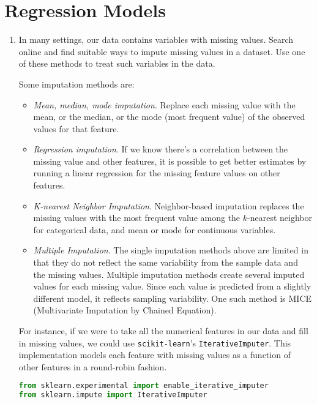 \documentclass{article}
\begin{document}
\section{Regression Models}
\begin{enumerate}[label={(\alph*)}]
    \item In many settings, our data contains variables with missing values.
    Search online and find suitable ways to impute missing values in a
    dataset. Use one of these methods to treat such variables in the data.
    
    Some imputation methods are:
    \begin{itemize}
      \item \emph{Mean, median, mode imputation}. Replace each missing value with
      the mean, or the median, or the mode (most frequent value) of the observed 
      values for that feature.
      \item \emph{Regression imputation}. If we know there's a correlation between
      the missing value and other features, it is possible to get better estimates
      by running a linear regression for the missing feature values on other
      features.
      \item \emph{K-nearest Neighbor Imputation}. Neighbor-based imputation replaces
      the missing values with the most frequent value among the $k$-nearest neighbor
      for categorical data, and mean or mode for continuous variables.
      \item \emph{Multiple Imputation}. The single imputation methods above are limited
      in that they do not reflect the same variability from the sample data and the
      missing values. Multiple imputation methods create several imputed values for
      each missing value. Since each value is predicted from a slightly different model,
      it reflects sampling variability. One such method is MICE (Multivariate Imputation
      by Chained Equation).
    \end{itemize}
    
    For instance, if we were to take all the numerical features in our data and fill in
    missing values, we could use \texttt{scikit-learn}'s \texttt{IterativeImputer}.
    This implementation models each feature with missing values as a function of other
    features in a round-robin fashion.

\begin{lstlisting}[language=Python, caption=Imputing missing values using
\texttt{IterativeImputer}]
from sklearn.experimental import enable_iterative_imputer
from sklearn.impute import IterativeImputer


\end{lstlisting}
\end{enumerate}
\end{document}
